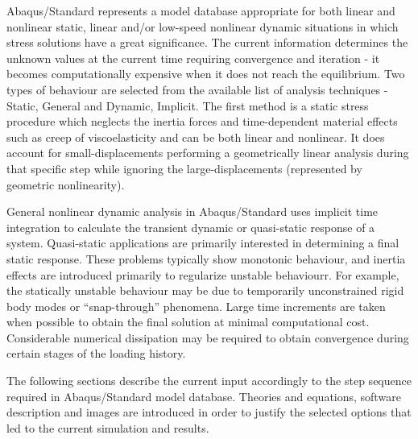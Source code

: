 \documentclass[12pt,a4paper]{report}
\begin{document}
Abaqus/Standard represents a model database appropriate for both linear and nonlinear static, linear and/or low-speed nonlinear dynamic situations in which stress solutions have a great significance. The current information determines the unknown values at the current time requiring convergence and iteration - it becomes computationally expensive when it does not reach the equilibrium. Two types of behaviour are selected from the available list of analysis techniques - Static, General and Dynamic, Implicit. The first method is a static stress procedure which neglects the inertia forces and time-dependent material effects such as creep of viscoelasticity and can be both linear and nonlinear. It does account for small-displacements performing a geometrically linear analysis during that specific step while ignoring the large-displacements (represented by geometric nonlinearity).

General nonlinear dynamic analysis in Abaqus/Standard uses implicit time integration to calculate the transient dynamic or quasi-static response of a system. Quasi-static applications are primarily interested in determining a final static response. These problems typically show monotonic behaviour, and inertia effects are introduced primarily to regularize unstable behaviourr. For example, the statically unstable behaviour may be due to temporarily unconstrained rigid body modes or “snap-through” phenomena. Large time increments are taken when possible to obtain the final solution at minimal computational cost. Considerable numerical dissipation may be required to obtain convergence during certain stages of the loading history.

The following sections describe the current input accordingly to the step sequence required in Abaqus/Standard model database. Theories and equations, software description and images are introduced in order to justify the selected options that led to the current simulation and results.
\end{document}
